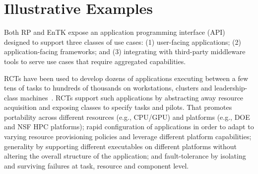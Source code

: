 \documentclass[preprint,12pt, a4paper]{elsarticle}
\begin{document}
\section{Illustrative Examples}\label{sec:examples}




Both RP and EnTK expose an application programming interface
(API)~\cite{rp-api-url,entk-api-url} designed to support three classes of use
cases: (1) user-facing applications; (2) application-facing frameworks; and (3)
integrating with third-party middleware tools to serve use cases that require
aggregated capabilities.


RCTs have been used to develop dozens of applications executing between a few tens
of tasks to hundreds of thousands on workstations, clusters and leadership-class
machines~\cite{radical-pub-url}. RCTs support such applications by abstracting
away resource acquisition and exposing classes to specify tasks and pilots. That
promotes portability across different resources (e.g., CPU/GPU) and platforms
(e.g., DOE and NSF HPC platforms); rapid configuration of applications in
order to adapt to varying resource provisioning policies and leverage different
platform capabilities; generality by supporting different executables on
different platforms without altering the overall structure of the application;
and fault-tolerance by isolating and surviving failures at task, resource and
component level.
\end{document}
